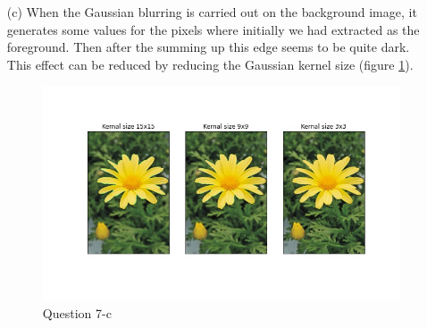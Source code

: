 \documentclass[11pt]{article}
\begin{document}
\begin{itemize}
    \item[(c)] When the Gaussian blurring is carried out on the background image, it generates some values for the pixels where initially we had
    extracted as the foreground. Then after the summing up this edge seems to be quite dark. This effect can be reduced by reducing the Gaussian 
    kernel size (figure \ref{73}).

    \begin{figure}[!h]
        \centering
        \includegraphics[width=\textwidth]{Images/73.jpg}
        \caption{Question 7-c}
        \label{73}
    \end{figure}
     
\end{itemize} 
    
%
%
\end{document}
